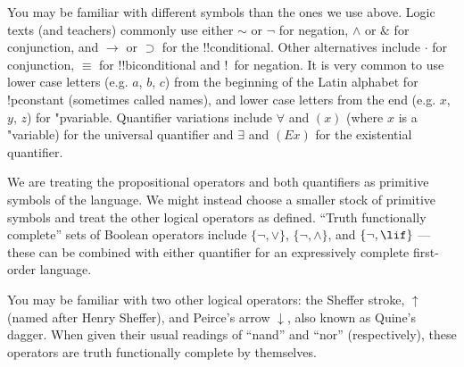 \documentclass[../../include/open-logic-section]{subfiles}
\begin{document}

\begin{intro}
You may be familiar with different symbols than the ones we use
above. Logic texts (and teachers) commonly use either $\sim$ or $\neg$
for negation, $\wedge$ or $\&$ for conjunction, and $\rightarrow$ or
$\supset$ for the !!{conditional}. Other alternatives include $\cdot$ for
conjunction, $\equiv$ for !!{biconditional} and !~for negation. It is very
common to use lower case letters (e.g. $a$, $b$, $c$) from the
beginning of the Latin alphabet for !p{constant} (sometimes called
names), and lower case letters from the end (e.g. $x$, $y$, $z$)
for "p{variable}. Quantifier variations include $\forall$ and $(x)$
(where $x$ is a "{variable}) for the universal quantifier and
$\exists$ and $(Ex)$ for the existential quantifier.
\end{intro}


\begin{explain}
We are treating the propositional operators and both quantifiers as
primitive symbols of the language. We might instead choose a smaller
stock of primitive symbols and treat the other logical operators as
defined. ``Truth functionally complete'' sets of Boolean operators
include $\{ \lnot, \lor \}$, $\{ \lnot, \land \}$, and $\{ \lnot,
\lif\}$ --- these can be combined with either quantifier for an
expressively complete first-order language.

You may be familiar with two other logical operators: the Sheffer
stroke, $\uparrow$ (named after Henry Sheffer), and Peirce's arrow
$\downarrow$, also known as Quine's dagger. When given their usual
readings of ``nand'' and ``nor'' (respectively), these operators are
truth functionally complete by themselves.
\end{explain}
\end{document}
